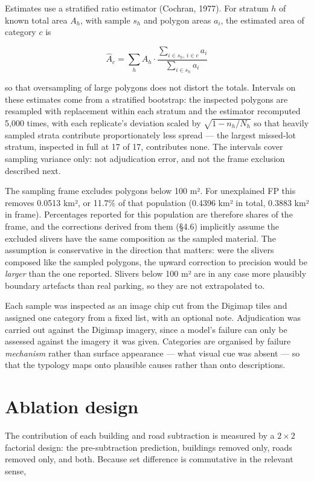 Estimates use a stratified ratio estimator (Cochran, 1977). For stratum \(h\) of known total area \(A_h\), with sample \(s_h\) and polygon areas \(a_i\), the estimated area of category \(c\) is

\[
\hat{A}_c = \sum_h A_h \cdot \frac{\sum_{i \in s_h,\, i \in c} a_i}{\sum_{i \in s_h} a_i}
\]

so that oversampling of large polygons does not distort the totals. Intervals on these estimates come from a stratified bootstrap: the inspected polygons are resampled with replacement within each stratum and the estimator recomputed 5,000 times, with each replicate's deviation scaled by \(\sqrt{1 - n_h/N_h}\) so that heavily sampled strata contribute proportionately less spread --- the largest missed-lot stratum, inspected in full at 17 of 17, contributes none. The intervals cover sampling variance only: not adjudication error, and not the frame exclusion described next.

The sampling frame excludes polygons below 100 m². For unexplained FP this removes 0.0513 km², or 11.7\% of that population (0.4396 km² in total, 0.3883 km² in frame). Percentages reported for this population are therefore shares of the frame, and the corrections derived from them (§4.6) implicitly assume the excluded slivers have the same composition as the sampled material. The assumption is conservative in the direction that matters: were the slivers composed like the sampled polygons, the upward correction to precision would be \emph{larger} than the one reported. Slivers below 100 m² are in any case more plausibly boundary artefacts than real parking, so they are not extrapolated to.

Each sample was inspected as an image chip cut from the Digimap tiles and assigned one category from a fixed list, with an optional note. Adjudication was carried out against the Digimap imagery, since a model's failure can only be assessed against the imagery it was given. Categories are organised by failure \emph{mechanism} rather than surface appearance --- what visual cue was absent --- so that the typology maps onto plausible causes rather than onto descriptions.

\hypertarget{ablation-design}{%
\section{Ablation design}\label{ablation-design}}

The contribution of each building and road subtraction is measured by a \(2 \times 2\) factorial design: the pre-subtraction prediction, buildings removed only, roads removed only, and both. Because set difference is commutative in the relevant sense,

